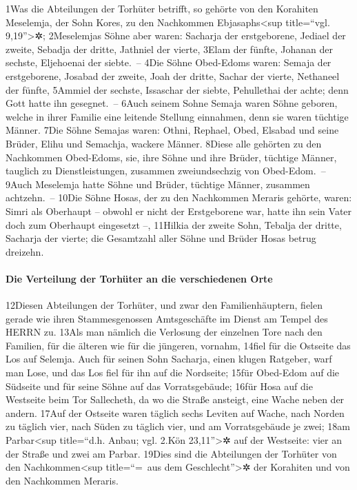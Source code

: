 1Was die Abteilungen der Torhüter betrifft, so gehörte von den Korahiten
Meselemja, der Sohn Kores, zu den Nachkommen Ebjasaphs\textless sup
title=``vgl. 9,19''\textgreater✲; 2Meselemjas Söhne aber waren: Sacharja
der erstgeborene, Jediael der zweite, Sebadja der dritte, Jathniel der
vierte, 3Elam der fünfte, Johanan der sechste, Eljehoenai der siebte.~--
4Die Söhne Obed-Edoms waren: Semaja der erstgeborene, Josabad der
zweite, Joah der dritte, Sachar der vierte, Nethaneel der fünfte,
5Ammiel der sechste, Issaschar der siebte, Pehullethai der achte; denn
Gott hatte ihn gesegnet.~-- 6Auch seinem Sohne Semaja waren Söhne
geboren, welche in ihrer Familie eine leitende Stellung einnahmen, denn
sie waren tüchtige Männer. 7Die Söhne Semajas waren: Othni, Rephael,
Obed, Elsabad und seine Brüder, Elihu und Semachja, wackere Männer.
8Diese alle gehörten zu den Nachkommen Obed-Edoms, sie, ihre Söhne und
ihre Brüder, tüchtige Männer, tauglich zu Dienstleistungen, zusammen
zweiundsechzig von Obed-Edom.~-- 9Auch Meselemja hatte Söhne und Brüder,
tüchtige Männer, zusammen achtzehn.~-- 10Die Söhne Hosas, der zu den
Nachkommen Meraris gehörte, waren: Simri als Oberhaupt -- obwohl er
nicht der Erstgeborene war, hatte ihn sein Vater doch zum Oberhaupt
eingesetzt --, 11Hilkia der zweite Sohn, Tebalja der dritte, Sacharja
der vierte; die Gesamtzahl aller Söhne und Brüder Hosas betrug dreizehn.

\hypertarget{die-verteilung-der-torhuxfcter-an-die-verschiedenen-orte}{%
\paragraph{Die Verteilung der Torhüter an die verschiedenen
Orte}\label{die-verteilung-der-torhuxfcter-an-die-verschiedenen-orte}}

12Diesen Abteilungen der Torhüter, und zwar den Familienhäuptern, fielen
gerade wie ihren Stammesgenossen Amtsgeschäfte im Dienst am Tempel des
HERRN zu. 13Als man nämlich die Verlosung der einzelnen Tore nach den
Familien, für die älteren wie für die jüngeren, vornahm, 14fiel für die
Ostseite das Los auf Selemja. Auch für seinen Sohn Sacharja, einen
klugen Ratgeber, warf man Lose, und das Los fiel für ihn auf die
Nordseite; 15für Obed-Edom auf die Südseite und für seine Söhne auf das
Vorratsgebäude; 16für Hosa auf die Westseite beim Tor Sallecheth, da wo
die Straße ansteigt, eine Wache neben der andern. 17Auf der Ostseite
waren täglich sechs Leviten auf Wache, nach Norden zu täglich vier, nach
Süden zu täglich vier, und am Vorratsgebäude je zwei; 18am
Parbar\textless sup title=``d.h. Anbau; vgl. 2.Kön 23,11''\textgreater✲
auf der Westseite: vier an der Straße und zwei am Parbar. 19Dies sind
die Abteilungen der Torhüter von den Nachkommen\textless sup
title=``=~aus dem Geschlecht''\textgreater✲ der Korahiten und von den
Nachkommen Meraris.

